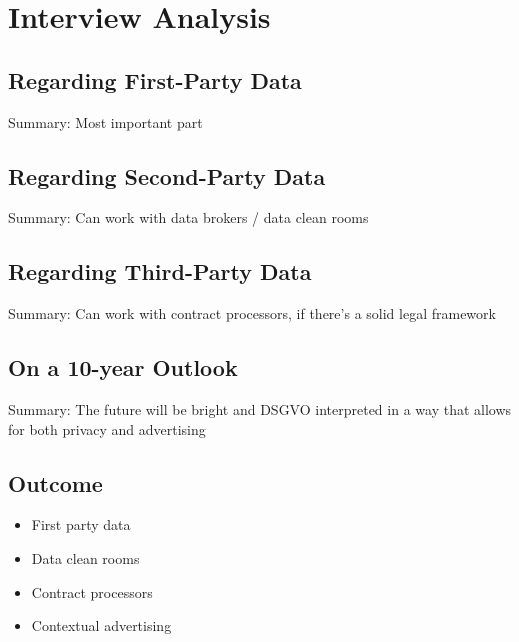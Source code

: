 %
%

\pagebreak
\section{Interview Analysis}

\onehalfspacing

\subsection{Regarding First-Party Data}

Summary: Most important part

\subsection{Regarding Second-Party Data}

Summary: Can work with data brokers / data clean rooms

\subsection{Regarding Third-Party Data}

Summary: Can work with contract processors, if there's a solid legal framework

\subsection{On a 10-year Outlook}

Summary: The future will be bright and DSGVO interpreted in a way that allows for both privacy and advertising

\subsection{Outcome}

\begin{itemize}
 \item First party data 
 \item Data clean rooms
 \item Contract processors
 \item Contextual advertising
\end{itemize}
